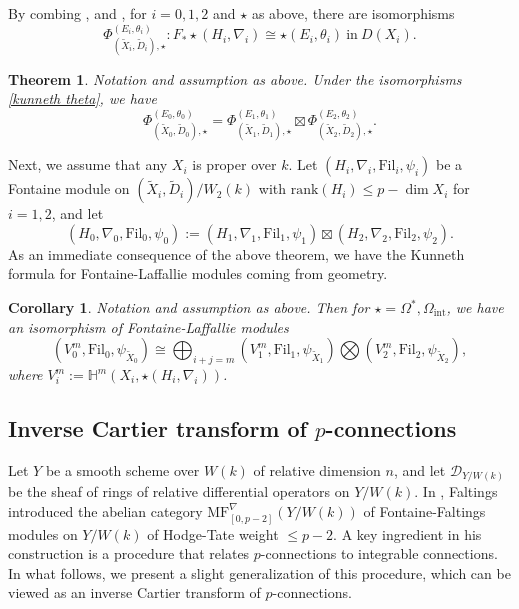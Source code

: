\documentclass[12pt, a4paper]{article}
\newtheorem{theorem}{Theorem}[section]
\newtheorem{corollary}{Corollary}[section]
\begin{document}
By combing \cite[Corollary 2.27]{OV}, \cite[Corollary 5.7]{Schepler} and \cite[Corollary 3.6]{SZ2}, for $i=0,1,2$ and $\star$ as above, there are isomorphisms
$$
\Phi_{(\tilde X_i,\tilde D_i),\star}^{(E_i,\theta_i)}:F_*\star(H_i,\nabla_i)\cong\star(E_i,\theta_i)~\mathrm{in}~D(X_i).
$$
\begin{theorem}
Notation and assumption as above. Under the isomorphisms \eqref{kunneth theta}, we have
$$
\Phi_{(\tilde X_0,\tilde D_0),\star}^{(E_0,\theta_0)}=\Phi_{(\tilde X_1,\tilde D_1),\star}^{(E_1,\theta_1)}\boxtimes\Phi_{(\tilde X_2,\tilde D_2),\star}^{(E_2,\theta_2)}.
$$
\end{theorem}
Next, we assume that any $X_i$ is proper over $k$. Let $(H_i,\nabla_i,\mathrm{Fil}_i,\psi_i)$ be a Fontaine module on $(\tilde X_i,\tilde D_i)/W_2(k)$ with $\mathrm{rank}(H_i)\leq p-\dim X_i$ for $i=1,2$, and let 
$$
(H_0,\nabla_0,\mathrm{Fil}_0,\psi_0):=(H_1,\nabla_1,\mathrm{Fil}_1,\psi_1)\boxtimes(H_2,\nabla_2,\mathrm{Fil}_2,\psi_2).
$$
As an immediate consequence of the above theorem, we have the Kunneth formula for Fontaine-Laffallie modules coming from geometry.
\begin{corollary}
Notation and assumption as above. Then for $\star=\Omega^*,\Omega_\mathrm{int}$, we have an isomorphism of Fontaine-Laffallie modules
$$
(V_0^m,\mathrm{Fil}_0,\psi_{\tilde X_0})\cong\bigoplus_{i+j=m}(V^m_1,\mathrm{Fil}_1,\psi_{\tilde X_1})\bigotimes(V^m_2,\mathrm{Fil}_2,\psi_{\tilde X_2}),
$$
where $V^m_i:=\mathbb H^m(X_i,\star(H_i,\nabla_i))$.
\end{corollary}
\fi




\subsection{Inverse Cartier transform of $p$-connections}
 Let $Y$ be a smooth scheme over $W(k)$ of relative dimension $n$, 
 and let $\mathcal D_{Y/W(k)}$ be the sheaf of rings of relative differential operators on $Y/W(k)$. In \cite{Fa}, Faltings introduced the abelian category $\mathrm{MF}^\nabla_{[0,p-2]}(Y/W(k))$ of Fontaine-Faltings modules on $Y/W(k)$ of Hodge-Tate weight $\leq p-2$. A key ingredient in his construction is a procedure that relates $p$-connections to integrable connections. In what follows, we present a slight generalization of this procedure, which can be viewed as an inverse Cartier transform of 
$p$-connections.
\end{document}
